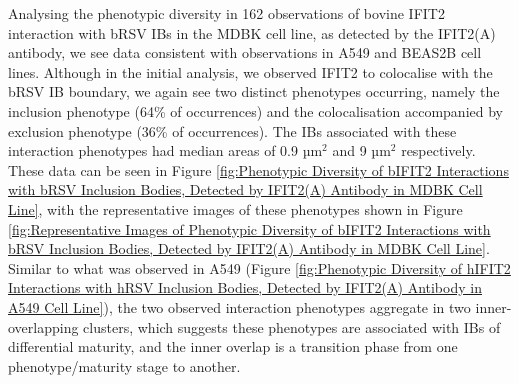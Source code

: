 Analysing the phenotypic diversity in 162 observations of bovine IFIT2 interaction with bRSV IBs in the MDBK cell line, as detected by the IFIT2(A) antibody, we see data consistent with observations in A549 and BEAS2B cell lines. Although in the initial analysis, we observed IFIT2 to colocalise with the bRSV IB boundary, we again see two distinct phenotypes occurring, namely the inclusion phenotype (64\% of occurrences) and the colocalisation accompanied by exclusion phenotype (36\% of occurrences). The IBs associated with these interaction phenotypes had median areas of 0.9 \(\mbox{µm}^2\) and 9 \(\mbox{µm}^2\) respectively. These data can be seen in Figure \ref{fig:Phenotypic Diversity of bIFIT2 Interactions with bRSV Inclusion Bodies, Detected by IFIT2(A) Antibody in MDBK Cell Line}, with the representative images of these phenotypes shown in Figure \ref{fig:Representative Images of Phenotypic Diversity of bIFIT2 Interactions with bRSV Inclusion Bodies, Detected by IFIT2(A) Antibody in MDBK Cell Line}. Similar to what was observed in A549 (Figure \ref{fig:Phenotypic Diversity of hIFIT2 Interactions with hRSV Inclusion Bodies, Detected by IFIT2(A) Antibody in A549 Cell Line}), the two observed interaction phenotypes aggregate in two inner-overlapping clusters, which suggests these phenotypes are associated with IBs of differential maturity, and the inner overlap is a transition phase from one phenotype/maturity stage to another.

